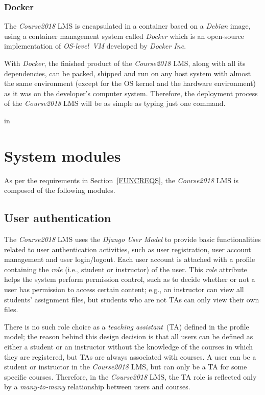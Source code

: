 \subsubsection{Docker}
The \emph{Course2018} LMS is encapsulated in a container based on a
\emph{Debian} image, using a container management system called \emph{Docker}
which is an open-source implementation of \emph{OS-level~VM} developed by
\emph{Docker Inc}.

\medskip

With \emph{Docker}, the finished product of the
\emph{Course2018} LMS, along with all its dependencies, can be packed, shipped
and run on any host system with almost the same environment
(except for the OS kernel and the hardware environment)
as it was on the
developer's computer system. Therefore, the deployment process of the
\emph{Course2018} LMS will be as simple as typing just one command.

 in


\section{System modules}

As per the requirements in Section~\ref{FUNCREQS}, the \emph{Course2018} LMS is
composed of the following modules.

\subsection{User authentication}
\label{sec:USRAUTH}
The \emph{Course2018} LMS uses the \emph{Django User Model} \cite{FdjangoUser}
to provide
basic functionalities related to user authentication activities, such as
user registration, user account management and user login/logout.
Each user account is attached with a profile containing the \emph{role}
(i.e., student or instructor) of the user. This \emph{role} attribute helps
the system perform permission control, such as to
decide whether or not a user has permission to access certain content;
e.g., an instructor can view all students' assignment
files, but students who are not TAs can only view their own files.

\medskip

There is no such role choice as a \emph{teaching assistant}~(TA) defined in the
profile model;
the reason behind this design decision is that all users can be defined as either a
student or an instructor without the knowledge of the courses in which they are
registered, but TAs are always associated with courses.
A user
can be a student or instructor in the \emph{Course2018} LMS, but can only
be a TA for some specific courses.
Therefore, in the \emph{Course2018} LMS, the TA role is
reflected only by a \emph{many-to-many} relationship between users and courses.

